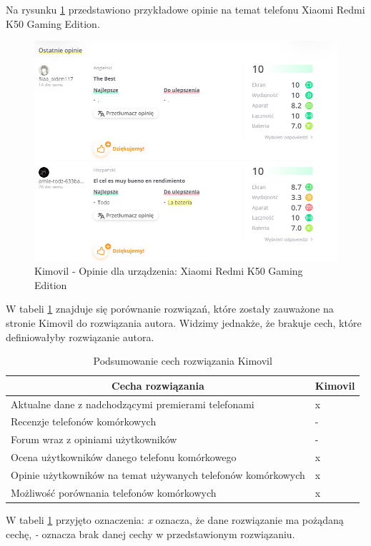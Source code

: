 Na rysunku \ref*{kimovil_4} przedstawiono przykładowe opinie na temat telefonu Xiaomi Redmi K50 Gaming Edition.
\begin{figure}[H]
    \centering
    \includegraphics[scale=0.5]{img/Kimovil/opinieKimovil.png}
    \caption{Kimovil - Opinie dla urządzenia: Xiaomi Redmi K50 Gaming Edition}
    \label{kimovil_4}
\end{figure}
W tabeli \ref*{comparison_kimovil} znajduje się porównanie rozwiązań, które zostały zauważone na stronie Kimovil do rozwiązania autora. Widzimy jednakże, że brakuje cech, które definiowałyby rozwiązanie autora.
\begin{table}[H]
    \centering
    \begin{tabular}{|l|l|}
        \hline
        \multicolumn{1}{|c|}{Cecha rozwiązania}    & \multicolumn{1}{c|}{Kimovil} \\ \hline
        Aktualne dane z nadchodzącymi premierami telefonami & x                             \\ \hline
        Recenzje telefonów komórkowych                                  & -                                \\ \hline
        Forum wraz z opiniami użytkowników                   & -                                \\ \hline
        Ocena użytkowników danego telefonu komórkowego                  & x                             \\ \hline
        Opinie użytkowników na temat używanych telefonów komórkowych    & x                                 \\ \hline
        Możliwość porównania telefonów komórkowych                      & x                                \\ \hline
    \end{tabular}
    \caption{Podsumowanie cech rozwiązania Kimovil}
    \label{comparison_kimovil}
\end{table}
W tabeli \ref*{comparison_kimovil} przyjęto oznaczenia: \textit{x} oznacza, że dane rozwiązanie ma pożądaną cechę, \textit{-} oznacza brak danej cechy w przedstawionym rozwiązaniu.


